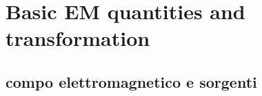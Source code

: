 \documentclass[main.tex]{subfiles}
\begin{document}
\chapter{Basic EM quantities and transformation}

\section{compo elettromagnetico e sorgenti}
\end{document}
